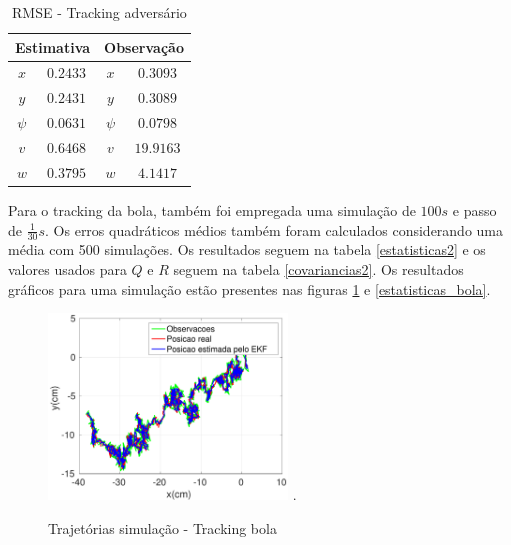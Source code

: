 \documentclass[a4paper,11pt]{article}
\begin{document}
\begin{table}[!t]
\caption{RMSE - Tracking adversário}
\label{estatisticas1}
\centering
\begin{tabular}{|c|c|c|c|} 
\hline
\multicolumn{2}{|c|}{Estimativa} & \multicolumn{2}{|c|}{Observação}\\
\hline
$x$ & $0.2433$ & $x$ & $0.3093$ \\
\hline
$y$ & $0.2431$ & $y$ & $0.3089$ \\
\hline
$\psi$ & $0.0631$ & $\psi$ & $0.0798$ \\
\hline
$v$ & $0.6468$ & $v$ & $19.9163$ \\
\hline
$w$ & $0.3795$ & $w$ & $4.1417$ \\
\hline
\end{tabular}
\end{table}

Para o tracking da bola, também foi empregada uma simulação de $100s$ e passo de $\frac{1}{30}s$. Os erros quadráticos médios também foram calculados considerando uma média com 500 simulações. Os resultados seguem na tabela \ref{estatisticas2} e os valores usados para $Q$ e $R$ seguem na tabela \ref{covariancias2}. Os resultados gráficos para uma simulação estão presentes nas figuras \ref{trajetorias2} e \ref{estatisticas_bola}.

\begin{figure}[!t]
\centering
\includegraphics[width=2.5in]{trajetorias2.pdf}
\DeclareGraphicsExtensions.
\caption{Trajetórias simulação - Tracking bola}
\label{trajetorias2}
\end{figure}
\end{document}
